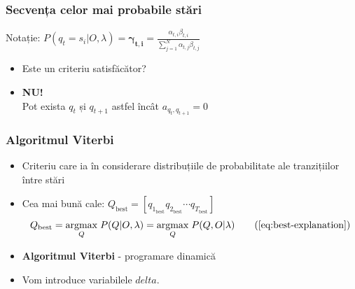 \begin{frame}
  \frametitle{Secvența celor mai probabile stări}
  Notație: $P(q_t = s_i \vert O, \lambda) = \mathbf{\gamma_{t,i}} = 
  \frac{\alpha_{t,i}\beta_{t,i}}{\displaystyle\sum_{j=1}^{N}\alpha_{t,j}\beta_{t,j}}$
  \begin{itemize}
  \item Este un criteriu satisfăcător?\pause
  \item \textbf{NU!}\\Pot exista $q_t$ și $q_{t+1}$ astfel încât $a_{q_t,q_{t+1}}=0$
  \end{itemize}

\end{frame}

\begin{frame}
  \frametitle{Algoritmul Viterbi}
  \begin{itemize}
  \item Criteriu care ia în considerare distribuțiile de probabilitate 
    ale tranzițiilor între stări
  \item Cea mai bună cale:
    $Q_{\text{best}} = [q_{1_{\text{best}}} q_{2_{\text{best}}} \cdots q_{T_{\text{best}}}]$
    \begin{equation}
      Q_{\text{best}} = \underset{Q}{\operatorname{argmax}}\;
      P(Q \vert O, \lambda)
      = \underset{Q}{\operatorname{argmax}}\; P(Q, O \vert \lambda)
      \tag{\ref{eq:best-explanation}}
    \end{equation}
  \item \textbf{Algoritmul Viterbi} - programare dinamică
  \item Vom introduce variabilele $delta$.
  \end{itemize}
\end{frame}

